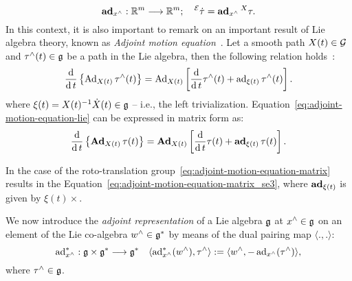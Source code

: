 \begin{equation}
    \operatorname{\mathbf{ad}}_{x^\wedge}: \mathbb{R}^m \longrightarrow \mathbb{R}^m; \quad {}^\mathcal{E} \dot{\tau} = \operatorname{\mathbf{ad}}_{x^\wedge} {}^X \tau.
\end{equation}
In this context, it is also important to remark on an important result of Lie algebra theory, known as \emph{Adjoint motion equation}~\citep[Proposition 4.2.2]{Holm2008GeometricRolling}. Let a smooth path $X(t) \in \mathcal{G}$ and $\tau^\wedge(t) \in \mathfrak{g}$ be a path in the Lie algebra, then the following relation holds~\citep[Proposition 4.2.2]{Holm2008GeometricRolling}:
\begin{equation}
\label{eq:adjoint-motion-equation-lie}
    \frac{\operatorname{d}}{\operatorname{d} t }\left\{\operatorname{Ad}_{X(t)} \tau^\wedge(t)\right\} =  \operatorname{Ad}_{X(t)} \left[ \frac{\operatorname{d}}{\operatorname{d} t} \tau^\wedge(t) + \operatorname{ad}_{\xi(t)}\tau^\wedge(t)   \right].
\end{equation}
where $\xi(t) = X(t)^{-1} \dot{X}(t) \in \mathfrak{g}$ -- i.e., the left trivialization. Equation~\eqref{eq:adjoint-motion-equation-lie} can be expressed in matrix form as:
\begin{equation}
\label{eq:adjoint-motion-equation-matrix}
     \frac{\operatorname{d}}{\operatorname{d} t }\left\{\operatorname{\mathbf{Ad}}_{X(t)} \tau(t)\right\} =  \operatorname{\mathbf{Ad}}_{X(t)} \left[ \frac{\operatorname{d}}{\operatorname{d} t} \tau(t) + \operatorname{\mathbf{ad}}_{\xi(t)}\tau(t)   \right].
\end{equation}
\par
In the case of the roto-translation group~\eqref{eq:adjoint-motion-equation-matrix} results in the Equation~\eqref{eq:adjoint-motion-equation-matrix_se3}, where  $\operatorname{\mathbf{ad}}_{\xi(t)}$ is given by $\xi(t) \times$.
\par
We now introduce the \emph{adjoint representation} of a Lie algebra $\mathfrak{g}$ at $x^\wedge\in\mathfrak{g}$ on an element of the Lie co-algebra $w^\wedge \in \mathfrak{g}^*$ by means of the dual pairing map $\langle.,.\rangle$:
\begin{equation}
\label{eq:co-adjoint_action_lie_def}
    \operatorname{ad}_{x^\wedge} ^*: \mathfrak{g} \times \mathfrak{g}^* \longrightarrow \mathfrak{g}^* \quad \langle \operatorname{ad}_{x^\wedge}^* (w^\wedge), \tau^\wedge \rangle:=  \langle w^\wedge, -\operatorname{ad}_{{x^\wedge}}(\tau^\wedge) \rangle,
\end{equation}
where $\tau^\wedge \in \mathfrak{g}$.

